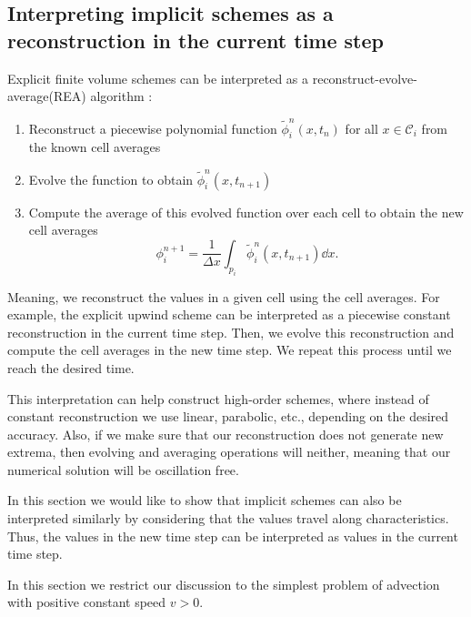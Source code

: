 \documentclass[../thesis.tex]{subfiles}
\begin{document}
\subsection{Interpreting implicit schemes as a reconstruction in the current time step}

Explicit finite volume schemes can be interpreted as a reconstruct-evolve-average(REA)
algorithm \cite{1992_LeVeque_BOOK,2002_LeVeque_BOOK,1977_VanLeer}:
\begin{enumerate}
    \item Reconstruct a piecewise polynomial function \(\tilde{\phi}_{i}^{n}(x,t_n)\) for all \(x \in \mathcal{C}_i\) from the known cell averages
    \item Evolve the function to obtain \(\tilde{\phi}_{i}^{n}(x,t_{n+1})\)
    \item Compute the average of this evolved function over each cell to obtain the new cell averages\[\phi_{i}^{n+1} =\frac{1}{\Delta x}\int_{p_i}\tilde{\phi}_{i}^{n}(x,t_{n+1}) \dd{x}.\]
\end{enumerate}
Meaning, we reconstruct the values in a given cell using the cell averages.
For example, the explicit upwind scheme can be interpreted as a piecewise constant reconstruction in the current time step. Then, we evolve this reconstruction and compute
the cell averages in the new time step. We repeat this process until we reach the
desired time.

This interpretation can help construct high-order schemes, where instead of constant
reconstruction we use linear, parabolic, etc., depending on the desired accuracy.
Also, if we make sure that our reconstruction does not generate new extrema, then evolving and averaging operations will neither, meaning that our numerical solution
will be oscillation free.

In this section we would like to show that implicit schemes can also be interpreted similarly by considering that the values travel along characteristics. Thus, the
values in the new time step can be interpreted as values in the current time step.

In this section we restrict our discussion to the simplest problem of advection with positive constant speed \(v > 0\).
\end{document}
